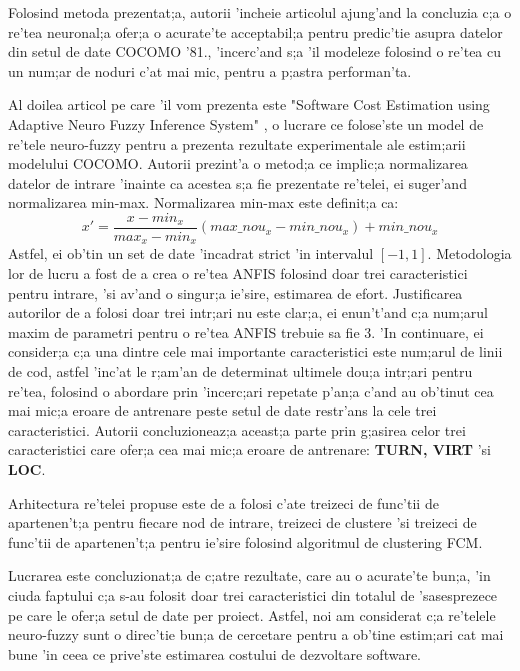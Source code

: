 Folosind metoda prezentat;a, autorii 'incheie articolul ajung'and la concluzia c;a o re'tea neuronal;a ofer;a o acurate'te acceptabil;a pentru predic'tie asupra datelor din setul de date COCOMO '81., 'incerc'and s;a 'il modeleze folosind o re'tea cu un num;ar de noduri c'at mai mic, pentru a p;astra performan'ta.
\par
Al doilea articol pe care 'il vom prezenta este "Software Cost Estimation using Adaptive Neuro Fuzzy Inference System" \cite{anfiscost}, o lucrare ce folose'ste un model de re'tele neuro-fuzzy pentru a prezenta rezultate experimentale ale estim;arii modelului COCOMO. Autorii prezint'a o metod;a ce implic;a normalizarea datelor de intrare 'inainte ca acestea s;a fie prezentate re'telei, ei suger'and normalizarea min-max. Normalizarea min-max este definit;a ca:
\begin{equation} 
x' = \frac{x - min_{x}}{max_{x} - min_{x}} (max\_nou_{x} - min\_nou_{x}) + min\_nou_{x}
\end{equation}
Astfel, ei ob'tin un set de date 'incadrat strict 'in intervalul $[-1, 1]$.
Metodologia lor de lucru a fost de a crea o re'tea ANFIS folosind doar trei caracteristici pentru intrare, 'si av'and o singur;a ie'sire, estimarea de efort. Justificarea autorilor de a folosi doar trei intr;ari nu este clar;a, ei enun't'and c;a num;arul maxim de parametri pentru o re'tea ANFIS trebuie sa fie 3. 'In continuare, ei consider;a c;a una dintre cele mai importante caracteristici este num;arul de linii de cod, astfel 'inc'at le r;am'an de determinat ultimele dou;a intr;ari pentru re'tea, folosind o abordare prin 'incerc;ari repetate p'an;a c'and au ob'tinut cea mai mic;a eroare de antrenare peste setul de date restr'ans la cele trei caracteristici. Autorii concluzioneaz;a aceast;a parte prin g;asirea celor trei caracteristici care ofer;a cea mai mic;a eroare de antrenare: \textbf{TURN, VIRT} 'si \textbf{LOC}.
\par
Arhitectura re'telei propuse este de a folosi c'ate treizeci de func'tii de apartenen't;a pentru fiecare nod de intrare, treizeci de clustere 'si treizeci de func'tii de apartenen't;a pentru ie'sire folosind algoritmul de clustering FCM. 
\par
Lucrarea este concluzionat;a de c;atre rezultate, care au o acurate'te bun;a, 'in ciuda faptului c;a s-au folosit doar trei caracteristici din totalul de 'sasesprezece pe care le ofer;a setul de date per proiect. Astfel, noi am considerat c;a re'telele neuro-fuzzy sunt o direc'tie bun;a de cercetare pentru a ob'tine estim;ari cat mai bune 'in ceea ce prive'ste estimarea costului de dezvoltare software.
\par